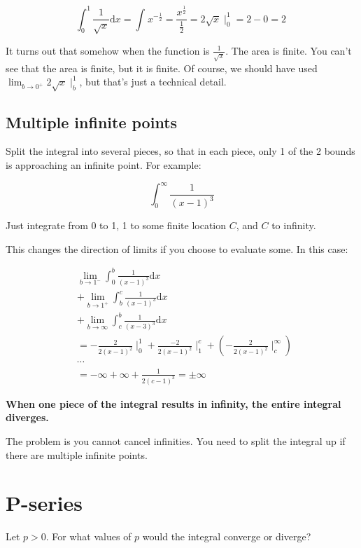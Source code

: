 \documentclass[12pt]{article}
\theoremstyle{plain}
\theoremstyle{remark}
\theoremstyle{definition}
\begin{document}
\[\int_{0}^{1}{\frac{1}{\sqrt{x}}\text{d}x} = \int_{}^{}x^{- \frac{1}{2}} = \frac{x^{\frac{1}{2}}}{\frac{1}{2}} = 2\sqrt{x} \mid_{0}^{1} = 2 - 0 = 2\ \]

It turns out that somehow when the function is \(\frac{1}{\sqrt{x}}\).
The area is finite. You can't see that the area is finite, but it is
finite. Of course, we should have used
\(\lim_{b \rightarrow 0^{+}}{2\sqrt{x} \mid_{b}^{1}}\), but that's just
a technical detail.


\subsection{Multiple infinite points}

Split the integral into several pieces, so that in each piece, only 1 of
the 2 bounds is approaching an infinite point. For example:

\[\int_{0}^{\infty}\frac{1}{(x - 1)^{3}}\]

Just integrate from 0 to 1, 1 to some finite location \(C\), and \(C\)
to infinity.


This changes the direction of limits if you choose to evaluate some. In
this case:

\begin{align*}
&\lim_{b \rightarrow 1^{-}}{\int_{0}^{b}{\frac{1}{(x - 1)^{3}}\text{d}x}}  \\
&+ \lim_{b \rightarrow 1^{+}}{\int_{b}^{c}\frac{1}{(x - 1)^{3}}\text{d}x}  \\
&+ \lim_{b \rightarrow \infty}{\int_{c}^{b}{\frac{1}{(x - 3)^{3}}\text{d}x}} \\
&= - \frac{2}{{2(x - 1)}^{2}} \mid_{0}^{1} + \frac{- 2}{{2(x - 1)}^{2}} \mid_{1}^{c} + \left( - \frac{2}{{2(x - 1)}^{2}} \mid_{c}^{\infty} \right)\  \\
&\cdots \\
&= - \infty + \infty + \frac{1}{2(c - 1)^{3}} = \pm \infty
\end{align*}


\textbf{When one piece of the integral results in infinity, the entire
integral diverges.}

The problem is you cannot cancel infinities. You need to split the
integral up if there are multiple infinite points.


\section{P-series}

Let \(p > 0\). For what values of \(p\) would the integral converge or
diverge?
\end{document}
